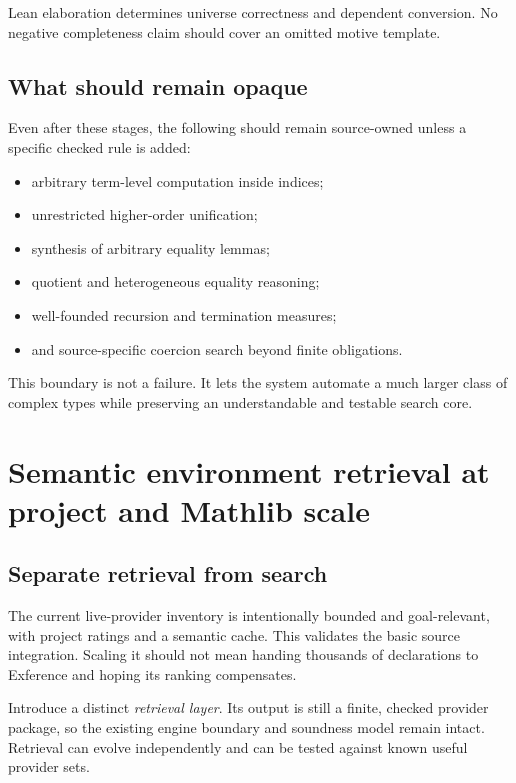 \documentclass[11pt]{article}
\newcommand{\Exference}{Exference}
\newcommand{\term}[1]{\emph{#1}}
\begin{document}
Lean elaboration determines universe correctness and dependent conversion.  No
negative completeness claim should cover an omitted motive template.

\subsection{What should remain opaque}

Even after these stages, the following should remain source-owned unless a
specific checked rule is added:

\begin{itemize}
  \item arbitrary term-level computation inside indices;
  \item unrestricted higher-order unification;
  \item synthesis of arbitrary equality lemmas;
  \item quotient and heterogeneous equality reasoning;
  \item well-founded recursion and termination measures;
  \item and source-specific coercion search beyond finite obligations.
\end{itemize}

This boundary is not a failure.  It lets the system automate a much larger
class of complex types while preserving an understandable and testable search
core.

\section{Semantic environment retrieval at project and Mathlib scale}
\label{sec:retrieval}

\subsection{Separate retrieval from search}

The current live-provider inventory is intentionally bounded and goal-relevant,
with project ratings and a semantic cache.  This validates the basic source
integration.  Scaling it should not mean handing thousands of declarations to
\Exference{} and hoping its ranking compensates.

Introduce a distinct \term{retrieval layer}.  Its output is still a finite,
checked provider package, so the existing engine boundary and soundness model
remain intact.  Retrieval can evolve independently and can be tested against
known useful provider sets.
\end{document}
